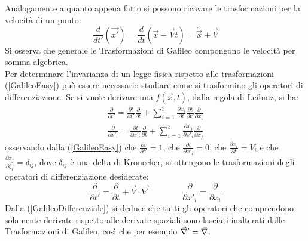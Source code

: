 Analogamente a quanto appena fatto si possono ricavare le trasformazioni per la velocità di un punto:
\begin{equation}
	\frac{d}{dt'}(\vec{x'})=\frac{d}{dt}(\vec{x}-\vec{V}t)=\dot{\vec{x}}+\vec{V}
\end{equation}
Si osserva che generale le Trasformazioni di Galileo compongono le velocità per somma algebrica.\\

Per determinare l'invarianza di un legge fisica rispetto alle trasformazioni (\ref{GalileoEasy}) può essere necessario 
studiare come si trasformino gli operatori di differenziazione. 
Se si vuole derivare una $f(\vec{x},t)$, dalla regola di Leibniz, si ha:
\begin{equation*}
	\begin{gathered}
		\frac{\partial}{\partial t'}=\frac{\partial t}{\partial t'}\frac{\partial}{\partial t}+
		\sum_{i=1}^{3}\frac{\partial x_i}{\partial t}\frac{\partial t}{\partial t'}
		\frac{\partial}{\partial x_i} \\
		\frac{\partial}{\partial x'_i}=\frac{\partial t}{\partial x'_i}\frac{\partial}{\partial t}+
		\sum_{i=1}^{3}\frac{\partial x_j}{\partial x'_i}\frac{\partial}{\partial x_j}
	\end{gathered}
\end{equation*}
osservando dalla (\ref{GalileoEasy}) che $\frac{\partial t}{\partial t'}=1$, che 
$\frac{\partial t}{\partial x'_i}=0$, che $\frac{\partial x_i}{\partial t}=V_i$ e che 
$\frac{\partial x_j}{\partial \xi_i}=\delta_{ij}$, dove $\delta_{ij}$ è una delta di Kronecker, 
si ottengono le trasformazioni degli operatori di differenziazione desiderate:
\begin{equation}
	\frac{\partial}{\partial t'}=\frac{\partial}{\partial t}+\vec{V}\cdot\vec{\nabla} \qquad \qquad
	\frac{\partial}{\partial x'_i}=\frac{\partial}{\partial x_i}
	\label{GalileoDifferenziale}
\end{equation}
Dalla (\ref{GalileoDifferenziale}) si deduce che tutti gli operatori che comprendono solamente derivate 
rispetto alle derivate spaziali sono lasciati inalterati dalle Trasformazioni di Galileo, così che per esempio $\vec{\nabla}'=\vec{\nabla}$.
